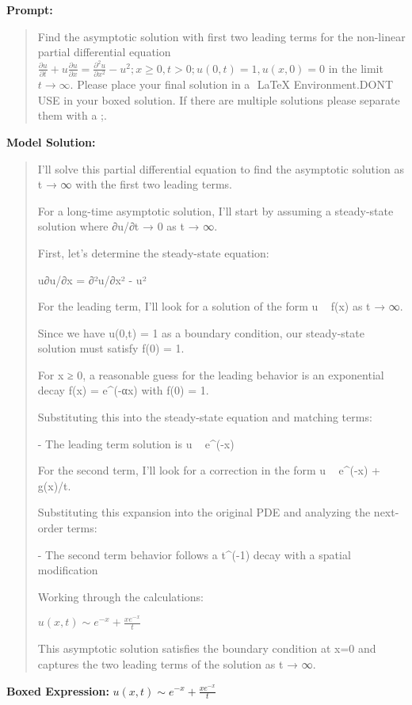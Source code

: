 \documentclass{article}
\begin{document}
\textbf{Prompt:}
\begin{quote}
Find the asymptotic solution with first two leading terms for the non-linear partial differential equation $\frac{\partial u}{\partial t} + u \frac{\partial u}{\partial x} = \frac{\partial^2 u}{\partial x^2} - u^2; x \geq 0, t > 0; u(0, t) = 1, u(x,0) = 0$ in the limit $t \rightarrow \infty$. Please place your final solution in a $\boxed{}$ LaTeX Environment.DONT USE \operatorname in your boxed solution. If there are multiple solutions please separate them with a ;.
\end{quote}
\textbf{Model Solution:}
\begin{quote}
I'll solve this partial differential equation to find the asymptotic solution as t → ∞ with the first two leading terms.



For a long-time asymptotic solution, I'll start by assuming a steady-state solution where ∂u/∂t → 0 as t → ∞.



First, let's determine the steady-state equation:

u∂u/∂x = ∂²u/∂x² - u²



For the leading term, I'll look for a solution of the form u ~ f(x) as t → ∞.



Since we have u(0,t) = 1 as a boundary condition, our steady-state solution must satisfy f(0) = 1.



For x ≥ 0, a reasonable guess for the leading behavior is an exponential decay f(x) = e^(-αx) with f(0) = 1.



Substituting this into the steady-state equation and matching terms:

- The leading term solution is u ~ e^(-x)



For the second term, I'll look for a correction in the form u ~ e^(-x) + g(x)/t.



Substituting this expansion into the original PDE and analyzing the next-order terms:

- The second term behavior follows a t^(-1) decay with a spatial modification



Working through the calculations:



$\boxed{u(x,t) \sim e^{-x} + \frac{xe^{-x}}{t}}$



This asymptotic solution satisfies the boundary condition at x=0 and captures the two leading terms of the solution as t → ∞.
\end{quote}
\textbf{Boxed Expression:} $u(x,t) \sim e^{-x} + \frac{xe^{-x}}{t}$
\end{document}
